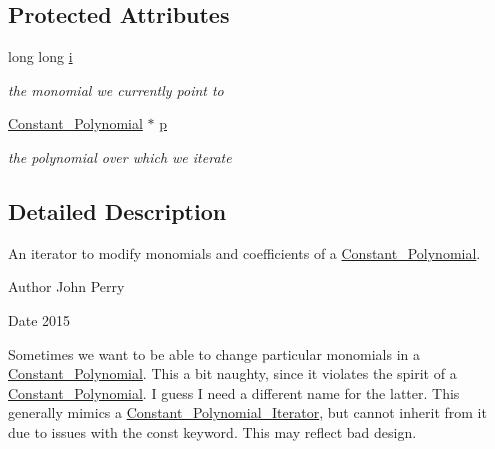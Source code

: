 \subsection*{Protected Attributes}
\begin{DoxyCompactItemize}
\item 
\mbox{\label{class_mutable___constant___polynomial___iterator_a7f2a05f25113363d7bb763d579aad653}} 
long long \hyperlink{class_mutable___constant___polynomial___iterator_a7f2a05f25113363d7bb763d579aad653}{i}
\begin{DoxyCompactList}\small\item\em the monomial we currently point to \end{DoxyCompactList}\item 
\mbox{\label{class_mutable___constant___polynomial___iterator_a9a9959010a5e8dc6cfdbef7c65ea26da}} 
\hyperlink{class_constant___polynomial}{Constant\+\_\+\+Polynomial} $\ast$ \hyperlink{class_mutable___constant___polynomial___iterator_a9a9959010a5e8dc6cfdbef7c65ea26da}{p}
\begin{DoxyCompactList}\small\item\em the polynomial over which we iterate \end{DoxyCompactList}\end{DoxyCompactItemize}


\subsection{Detailed Description}
An iterator to modify monomials and coefficients of a \hyperlink{class_constant___polynomial}{Constant\+\_\+\+Polynomial}. 

\begin{DoxyAuthor}{Author}
John Perry 
\end{DoxyAuthor}
\begin{DoxyDate}{Date}
2015
\end{DoxyDate}
Sometimes we want to be able to change particular monomials in a \hyperlink{class_constant___polynomial}{Constant\+\_\+\+Polynomial}. This a bit naughty, since it violates the spirit of a \hyperlink{class_constant___polynomial}{Constant\+\_\+\+Polynomial}. I guess I need a different name for the latter. This generally mimics a \hyperlink{class_constant___polynomial___iterator}{Constant\+\_\+\+Polynomial\+\_\+\+Iterator}, but cannot inherit from it due to issues with the {\ttfamily const} keyword. This may reflect bad design. 

